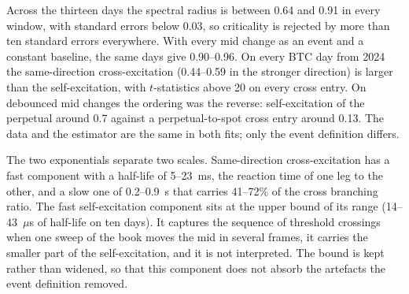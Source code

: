 \documentclass[a4paper,11pt]{article}
\begin{document}
Across the thirteen days the spectral radius is between 0.64 and 0.91 in every window, with standard errors below 0.03, so criticality is rejected by more than ten standard errors everywhere. With every mid change as an event and a constant baseline, the same days give 0.90--0.96. On every BTC day from 2024 the same-direction cross-excitation (0.44--0.59 in the stronger direction) is larger than the self-excitation, with $t$-statistics above 20 on every cross entry. On debounced mid changes the ordering was the reverse: self-excitation of the perpetual around 0.7 against a perpetual-to-spot cross entry around 0.13. The data and the estimator are the same in both fits; only the event definition differs.

The two exponentials separate two scales. Same-direction cross-excitation has a fast component with a half-life of 5--23~ms, the reaction time of one leg to the other, and a slow one of 0.2--0.9~s that carries 41--72\% of the cross branching ratio. The fast self-excitation component sits at the upper bound of its range (14--43~$\mu$s of half-life on ten days). It captures the sequence of threshold crossings when one sweep of the book moves the mid in several frames, it carries the smaller part of the self-excitation, and it is not interpreted. The bound is kept rather than widened, so that this component does not absorb the artefacts the event definition removed.
\end{document}

